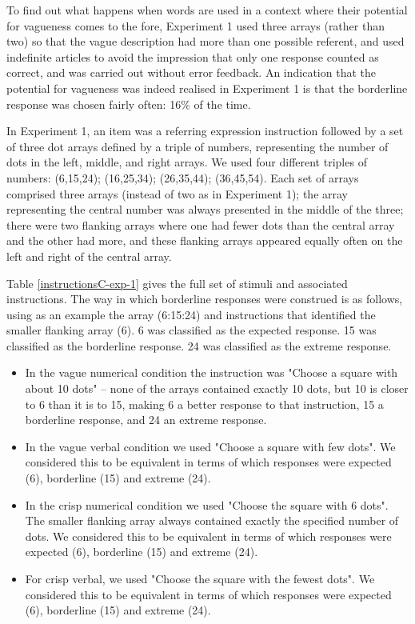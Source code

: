 
To find out what happens when words are used in a context where their potential for vagueness comes to the fore, Experiment 1 used three arrays (rather than two) so that the vague description had more than one possible referent, and used indefinite articles to avoid the impression that only one response counted as correct, and was carried out without error feedback. An indication that the potential for vagueness was indeed realised in Experiment 1 is that the borderline response was chosen fairly often: 16\% of the time.

In Experiment 1, an item was a referring expression instruction followed by a set of three dot arrays defined by a triple of numbers, representing the number of dots in the left, middle, and right arrays. We used four different triples of numbers: (6,15,24); (16,25,34); (26,35,44); (36,45,54). Each set of arrays comprised three arrays (instead of two as in Experiment 1); the array representing the central number was always presented in the middle of the three; there were two flanking arrays where one had fewer dots than the central array and the other had more, and these flanking arrays appeared equally often on the left and right of the central array. 

Table \ref{instructionsC-exp-1} gives the full set of stimuli and associated instructions. 
%
The way in which borderline responses were construed is as follows, using as an example the array (6:15:24) and instructions that identified the smaller flanking array (6). 6 was classified as the expected response. 15 was classified as the borderline response. 24 was classified as the extreme response. 

\begin{itemize}
\item In the vague numerical condition the instruction was "Choose a square with about 10 dots" -- none of the arrays contained exactly 10 dots, but 10 is closer to 6 than it is to 15, making 6 a better response to that instruction, 15 a borderline response, and 24 an extreme response. 
\item In the vague verbal condition we used "Choose a square with few dots". We considered this to be equivalent in terms of which responses were expected (6), borderline (15) and extreme (24).
\item In the crisp numerical condition we used "Choose the square with 6 dots". The smaller flanking array always contained exactly the specified number of dots. We considered this to be equivalent in terms of which responses were expected (6), borderline (15) and extreme (24).
\item For crisp verbal, we used "Choose the square with the fewest dots". We considered this to be equivalent in terms of which responses were expected (6), borderline (15) and extreme (24).
\end{itemize}

